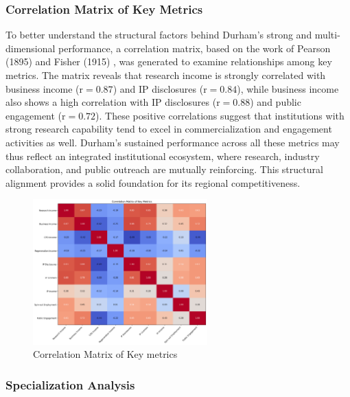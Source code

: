 \documentclass[journal,onecolumn, 10pt,draftclsnofoot]{IEEEtran}
\begin{document}
\subsubsection{Correlation Matrix of Key Metrics}

To better understand the structural factors behind Durham's strong and multi-dimensional performance, a correlation matrix, based on the work of Pearson (1895) \cite{pearson1895notes} and Fisher (1915) \cite{fisher1915frequency}, was generated to examine relationships among key metrics. The matrix reveals that research income is strongly correlated with business income ($\mathrm{r}=0.87$) and IP disclosures ($\mathrm{r}=0.84$), while business income also shows a high correlation with IP disclosures ($\mathrm{r}=0.88$) and public engagement ($\mathrm{r}=0.72$). These positive correlations suggest that institutions with strong research capability tend to excel in commercialization and engagement activities as well. Durham's sustained performance across all these metrics may thus reflect an integrated institutional ecosystem, where research, industry collaboration, and public outreach are mutually reinforcing. This structural alignment provides a solid foundation for its regional competitiveness.



\begin{figure}[h]
\centering
\includegraphics[width=0.6\textwidth]{Fig/figure36.correlation_matrix.png}
\caption{Correlation Matrix of Key metrics}
\label{fig:correlation-matrix}
\end{figure}

\subsubsection{Specialization Analysis}
\end{document}
